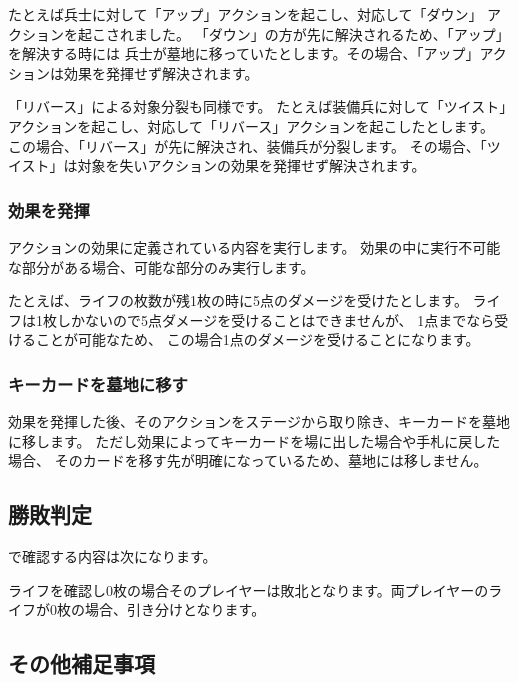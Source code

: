 \documentclass[letterpaper,10pt,dvipdfmx]{sphinxmanual}
\begin{document}
\sphinxAtStartPar
たとえば兵士に対して「アップ」アクションを起こし、対応して「ダウン」
アクションを起こされました。
「ダウン」の方が先に解決されるため、「アップ」を解決する時には
兵士が墓地に移っていたとします。その場合、「アップ」アクションは効果を発揮せず解決されます。

\sphinxAtStartPar
「リバース」による対象分裂も同様です。
たとえば装備兵に対して「ツイスト」アクションを起こし、対応して「リバース」アクションを起こしたとします。
この場合、「リバース」が先に解決され、装備兵が分裂します。
その場合、「ツイスト」は対象を失いアクションの効果を発揮せず解決されます。


\subsubsection{効果を発揮}
\label{\detokenize{common/common:id27}}
\sphinxAtStartPar
アクションの効果に定義されている内容を実行します。
効果の中に実行不可能な部分がある場合、可能な部分のみ実行します。

\sphinxAtStartPar
たとえば、ライフの枚数が残1枚の時に5点のダメージを受けたとします。
ライフは1枚しかないので5点ダメージを受けることはできませんが、
1点までなら受けることが可能なため、
この場合1点のダメージを受けることになります。


\subsubsection{キーカードを墓地に移す}
\label{\detokenize{common/common:keycard-gy}}\label{\detokenize{common/common:id28}}
\sphinxAtStartPar
効果を発揮した後、そのアクションをステージから取り除き、キーカードを墓地に移します。
ただし効果によってキーカードを場に出した場合や手札に戻した場合、
そのカードを移す先が明確になっているため、墓地には移しません。


\subsection{勝敗判定}
\label{\detokenize{common/common:id29}}
\sphinxAtStartPar
{\hyperref[\detokenize{core/core:winlose}]{}} で確認する内容は次になります。

\sphinxAtStartPar
ライフを確認し0枚の場合そのプレイヤーは敗北となります。両プレイヤーのライフが0枚の場合、引き分けとなります。


\subsection{その他補足事項}
\label{\detokenize{common/common:id30}}
\end{document}

